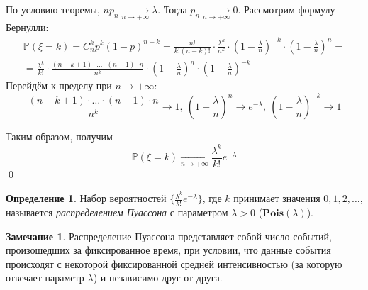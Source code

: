 \documentclass[oneside,final,14pt]{extreport}
\renewenvironment{proof}{{\bfseries Доказательство.}}{\qed}
\theoremstyle{plain}
\theoremstyle{definition}
\newtheorem*{defn}{Определение}
\newtheorem*{rmrk}{Замечание}
\theoremstyle{named}
\begin{document}
\begin{proof}
    По условию теоремы, $n p_n \xrightarrow[n \to +\infty]{} \lambda$. Тогда $p_n \xrightarrow[n \to +\infty]{} 0$. Рассмотрим формулу Бернулли:
    \begin{multline*}
        \mathbb{P}(\xi = k) = C_n^k p^k (1 - p)^{n-k} = \frac{n!}{k!(n - k)!} \cdot \frac{\lambda^k}{n^k} \cdot \left(1 - \frac{\lambda}{n}\right)^{-k} \cdot \left(1 - \frac{\lambda}{n}\right)^n = \\
        = \frac{\lambda^k}{k!} \cdot \frac{(n - k + 1) \cdot \ldots \cdot (n - 1) \cdot n}{n^k} \cdot \left(1 - \frac{\lambda}{n}\right)^n \cdot \left(1 - \frac{\lambda}{n}\right)^{-k}
    \end{multline*}
    Перейдём к пределу при $n \to +\infty$:
    \begin{equation*}
        \frac{(n - k + 1) \cdot \ldots \cdot (n - 1) \cdot n}{n^k} \to 1,~ \left(1 - \frac{\lambda}{n}\right)^n \to e^{-\lambda},~ \left(1 - \frac{\lambda}{n}\right)^{-k} \to 1
    \end{equation*}
    
    Таким образом, получим
    \begin{equation*}
        \mathbb{P}(\xi = k) \xrightarrow[n \to +\infty]{} \frac{\lambda^k}{k!} e^{-\lambda}
    \end{equation*}
\end{proof}

\begin{defn}
    Набор вероятностей $\{\frac{\lambda^k}{k!} e^{-\lambda} \}$, где $k$ принимает значения $0, 1, 2, \ldots$, называется {\it распределением Пуассона} с параметром $\lambda > 0$ ($\mathbf{Pois}(\lambda)$).
\end{defn}
\begin{rmrk}
    Распределение Пуассона представляет собой число событий, произошедших за фиксированное время, при условии, что данные события происходят с некоторой фиксированной средней интенсивностью (за которую отвечает параметр $\lambda$) и независимо друг от друга.
\end{rmrk}
\end{document}
